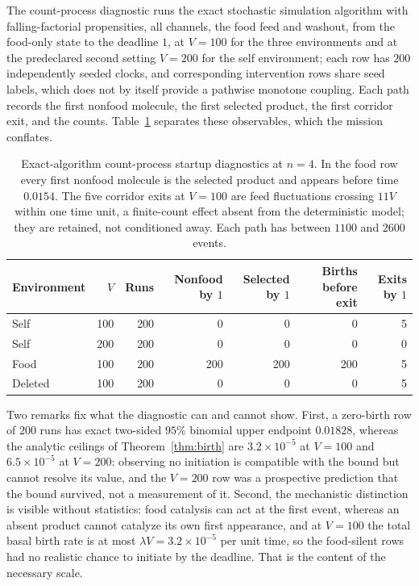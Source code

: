 \documentclass[11pt,letterpaper]{article}
\theoremstyle{plain}
\theoremstyle{definition}
\theoremstyle{remark}
\numberwithin{equation}{section}
\begin{document}
The count-process diagnostic runs the exact stochastic simulation algorithm \cite{gillespie1977exact} with falling-factorial propensities, all channels, the food feed and washout, from the food-only state to the deadline $1$, at $V=100$ for the three environments and at the predeclared second setting $V=200$ for the self environment; each row has $200$ independently seeded clocks, and corresponding intervention rows share seed labels, which does not by itself provide a pathwise monotone coupling. Each path records the first nonfood molecule, the first selected product, the first corridor exit, and the counts. Table~\ref{tab:ssa} separates these observables, which the mission conflates.

\begin{table}[t]
\centering\small
\begin{tabular}{@{}lrrrrrr@{}}
\toprule
Environment & $V$ & Runs & Nonfood by $1$ & Selected by $1$ & Births before exit & Exits by $1$\\
\midrule
Self & 100 & 200 & 0 & 0 & 0 & 5\\
Self & 200 & 200 & 0 & 0 & 0 & 0\\
Food & 100 & 200 & 200 & 200 & 200 & 5\\
Deleted & 100 & 200 & 0 & 0 & 0 & 5\\
\bottomrule
\end{tabular}
\caption{Exact-algorithm count-process startup diagnostics at $n=4$. In the food row every first nonfood molecule is the selected product and appears before time $0.0154$. The five corridor exits at $V=100$ are feed fluctuations crossing $11V$ within one time unit, a finite-count effect absent from the deterministic model; they are retained, not conditioned away. Each path has between $1100$ and $2600$ events.}
\label{tab:ssa}
\end{table}

Two remarks fix what the diagnostic can and cannot show. First, a zero-birth row of $200$ runs has exact two-sided $95\%$ binomial upper endpoint $0.01828$, whereas the analytic ceilings of Theorem~\ref{thm:birth} are $3.2\times10^{-5}$ at $V=100$ and $6.5\times10^{-5}$ at $V=200$: observing no initiation is compatible with the bound but cannot resolve its value, and the $V=200$ row was a prospective prediction that the bound survived, not a measurement of it. Second, the mechanistic distinction is visible without statistics: food catalysis can act at the first event, whereas an absent product cannot catalyze its own first appearance, and at $V=100$ the total basal birth rate is at most $\lambda V=3.2\times10^{-5}$ per unit time, so the food-silent rows had no realistic chance to initiate by the deadline. That is the content of the necessary scale.
\end{document}
